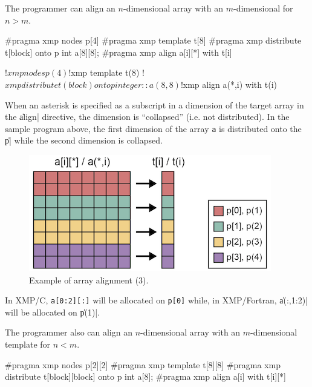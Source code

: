 
The programmer can align an $n$-dimensional array with an $m$-dimensional
{\template} for $n > m$.

\begin{XCexample}
#pragma xmp nodes p[4]
#pragma xmp template t[8]
#pragma xmp distribute t[block] onto p
int a[8][8];
#pragma xmp align a[i][*] with t[i]
\end{XCexample}

\begin{XFexample}
!$xmp nodes p(4)
!$xmp template t(8)
!$xmp distribute t(block) onto p
integer :: a(8,8)
!$xmp align a(*,i) with t(i)
\end{XFexample}

When an asterisk is specified as a subscript in a dimension of the
target array in the \|align| directive, the dimension is ``collapsed''
(i.e. not distributed). In the sample program above, the first dimension of the
array {\tt a} is distributed onto the {\narray} \|p| while the second
dimension is collapsed.

\begin{figure}
  \centering
  \includegraphics{figs/collapse.png}
  \caption{Example of array alignment (3).}
\end{figure}

In XMP/C, {\tt a[0:2][:]} will be allocated on {\tt p[0]} while, in
XMP/Fortran, \|a(:,1:2)| will be allocated on \|p(1)|.


The programmer also can align an $n$-dimensional array with an
$m$-dimensional template for $n < m$.

\begin{XCexample}
#pragma xmp nodes p[2][2]
#pragma xmp template t[8][8]
#pragma xmp distribute t[block][block] onto p
int a[8];
#pragma xmp align a[i] with t[i][*]
\end{XCexample}

